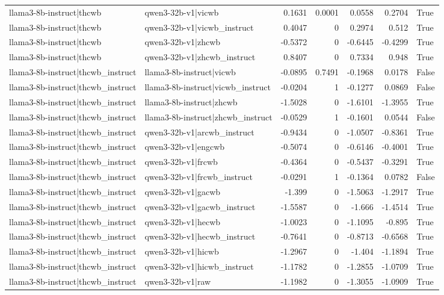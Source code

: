 \begin{table}
\begin{tabular}{l l r r r r l}
llama3-8b-instruct|thcwb & qwen3-32b-v1|vicwb & 0.1631 & 0.0001 & 0.0558 & 0.2704 & True \\
llama3-8b-instruct|thcwb & qwen3-32b-v1|vicwb_instruct & 0.4047 & 0 & 0.2974 & 0.512 & True \\
llama3-8b-instruct|thcwb & qwen3-32b-v1|zhcwb & -0.5372 & 0 & -0.6445 & -0.4299 & True \\
llama3-8b-instruct|thcwb & qwen3-32b-v1|zhcwb_instruct & 0.8407 & 0 & 0.7334 & 0.948 & True \\
llama3-8b-instruct|thcwb_instruct & llama3-8b-instruct|vicwb & -0.0895 & 0.7491 & -0.1968 & 0.0178 & False \\
llama3-8b-instruct|thcwb_instruct & llama3-8b-instruct|vicwb_instruct & -0.0204 & 1 & -0.1277 & 0.0869 & False \\
llama3-8b-instruct|thcwb_instruct & llama3-8b-instruct|zhcwb & -1.5028 & 0 & -1.6101 & -1.3955 & True \\
llama3-8b-instruct|thcwb_instruct & llama3-8b-instruct|zhcwb_instruct & -0.0529 & 1 & -0.1601 & 0.0544 & False \\
llama3-8b-instruct|thcwb_instruct & qwen3-32b-v1|arcwb_instruct & -0.9434 & 0 & -1.0507 & -0.8361 & True \\
llama3-8b-instruct|thcwb_instruct & qwen3-32b-v1|engcwb & -0.5074 & 0 & -0.6146 & -0.4001 & True \\
llama3-8b-instruct|thcwb_instruct & qwen3-32b-v1|frcwb & -0.4364 & 0 & -0.5437 & -0.3291 & True \\
llama3-8b-instruct|thcwb_instruct & qwen3-32b-v1|frcwb_instruct & -0.0291 & 1 & -0.1364 & 0.0782 & False \\
llama3-8b-instruct|thcwb_instruct & qwen3-32b-v1|gacwb & -1.399 & 0 & -1.5063 & -1.2917 & True \\
llama3-8b-instruct|thcwb_instruct & qwen3-32b-v1|gacwb_instruct & -1.5587 & 0 & -1.666 & -1.4514 & True \\
llama3-8b-instruct|thcwb_instruct & qwen3-32b-v1|hecwb & -1.0023 & 0 & -1.1095 & -0.895 & True \\
llama3-8b-instruct|thcwb_instruct & qwen3-32b-v1|hecwb_instruct & -0.7641 & 0 & -0.8713 & -0.6568 & True \\
llama3-8b-instruct|thcwb_instruct & qwen3-32b-v1|hicwb & -1.2967 & 0 & -1.404 & -1.1894 & True \\
llama3-8b-instruct|thcwb_instruct & qwen3-32b-v1|hicwb_instruct & -1.1782 & 0 & -1.2855 & -1.0709 & True \\
llama3-8b-instruct|thcwb_instruct & qwen3-32b-v1|raw & -1.1982 & 0 & -1.3055 & -1.0909 & True \\

\end{tabular}
\end{table}
